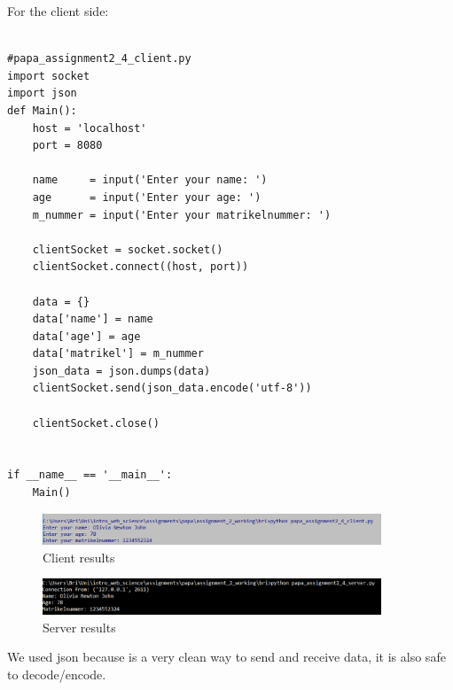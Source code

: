 \documentclass{WeSTassignment}
\begin{document}
For the client side:\\ \\
\begin{lstlisting}
#papa_assignment2_4_client.py
import socket
import json 
def Main():
    host = 'localhost'
    port = 8080

    name     = input('Enter your name: ')
    age      = input('Enter your age: ')
    m_nummer = input('Enter your matrikelnummer: ')

    clientSocket = socket.socket()
    clientSocket.connect((host, port))

    data = {}
    data['name'] = name
    data['age'] = age
    data['matrikel'] = m_nummer
    json_data = json.dumps(data)
    clientSocket.send(json_data.encode('utf-8'))

    clientSocket.close()


if __name__ == '__main__':
    Main()
\end{lstlisting}

\begin{figure}[!ht]
  	\centering
  	\includegraphics[width=0.9\textwidth]{results_client.png}
   	\caption{Client results}
     \label{fig:client}
\end{figure}
\begin{figure}[!ht]
  	\centering
  	\includegraphics[width=0.9\textwidth]{results_server.png}
   	\caption{Server results}
     \label{fig:server}
\end{figure}

We used json because is a very clean way to send and receive data, it is also safe to decode/encode.
\makefooter
\end{document}
